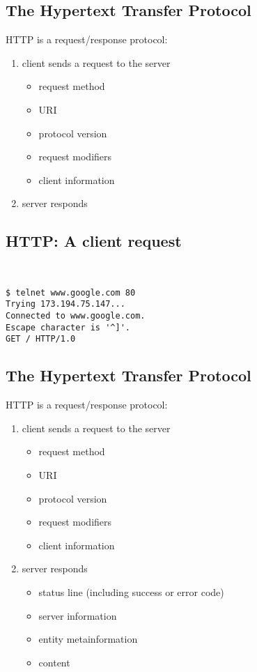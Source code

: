 \documentclass[xga]{xdvislides}
\begin{document}
\subsection{The Hypertext Transfer Protocol}
HTTP is a request/response protocol:
\begin{enumerate}
	\item client sends a request to the server
		\begin{itemize}
			\item request method
			\item URI
			\item protocol version
			\item request modifiers
			\item client information
		\end{itemize}
	\item server responds
\end{enumerate}

\subsection{HTTP: A client request}
\vspace*{.5in}
\\
\Hugesize
\begin{center}
\begin{verbatim}
$ telnet www.google.com 80
Trying 173.194.75.147...
Connected to www.google.com.
Escape character is '^]'.
GET / HTTP/1.0
\end{verbatim}
\end{center}
\Normalsize
\vspace*{\fill}


\subsection{The Hypertext Transfer Protocol}
HTTP is a request/response protocol:
\begin{enumerate}
	\item client sends a request to the server
		\begin{itemize}
			\item request method
			\item URI
			\item protocol version
			\item request modifiers
			\item client information
		\end{itemize}
	\item server responds
		\begin{itemize}
			\item status line (including success or error code)
			\item server information
			\item entity metainformation
			\item content
		\end{itemize}
\end{enumerate}
\end{document}
